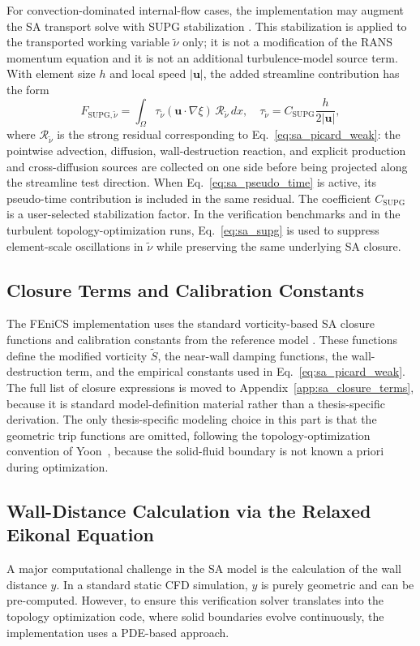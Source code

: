 For convection-dominated internal-flow cases, the implementation may augment the SA transport solve with SUPG stabilization \cite{Brooks1982}. This stabilization is applied to the transported working variable $\tilde{\nu}$ only; it is not a modification of the RANS momentum equation and it is not an additional turbulence-model source term. With element size $h$ and local speed $|\mathbf{u}|$, the added streamline contribution has the form
\begin{equation}
	F_{\mathrm{SUPG},\tilde{\nu}} =
	\int_\Omega \tau_{\tilde{\nu}}
	(\mathbf{u}\cdot\nabla\xi)\,
	\mathcal{R}_{\tilde{\nu}}\,dx,
	\quad
	\tau_{\tilde{\nu}} =
	C_{\mathrm{SUPG}}\frac{h}{2|\mathbf{u}|},
	\label{eq:sa_supg}
\end{equation}
where $\mathcal{R}_{\tilde{\nu}}$ is the strong residual corresponding to Eq.~\ref{eq:sa_picard_weak}: the pointwise advection, diffusion, wall-destruction reaction, and explicit production and cross-diffusion sources are collected on one side before being projected along the streamline test direction. When Eq.~\ref{eq:sa_pseudo_time} is active, its pseudo-time contribution is included in the same residual. The coefficient $C_{\mathrm{SUPG}}$ is a user-selected stabilization factor. In the verification benchmarks and in the turbulent topology-optimization runs, Eq.~\ref{eq:sa_supg} is used to suppress element-scale oscillations in $\tilde{\nu}$ while preserving the same underlying SA closure.

\subsection{Closure Terms and Calibration Constants}
The FEniCS implementation uses the standard vorticity-based SA closure functions and calibration constants from the reference model \cite{Spalart1994,NasaTurb}. These functions define the modified vorticity $\tilde{S}$, the near-wall damping functions, the wall-destruction term, and the empirical constants used in Eq.~\ref{eq:sa_picard_weak}. The full list of closure expressions is moved to Appendix~\ref{app:sa_closure_terms}, because it is standard model-definition material rather than a thesis-specific derivation. The only thesis-specific modeling choice in this part is that the geometric trip functions are omitted, following the topology-optimization convention of Yoon~\cite{Yoon2016}, because the solid-fluid boundary is not known a priori during optimization.

\subsection{Wall-Distance Calculation via the Relaxed Eikonal Equation}
A major computational challenge in the SA model is the calculation of the wall distance $y$. In a standard static CFD simulation, $y$ is purely geometric and can be pre-computed. However, to ensure this verification solver translates into the topology optimization code, where solid boundaries evolve continuously, the implementation uses a PDE-based approach.

